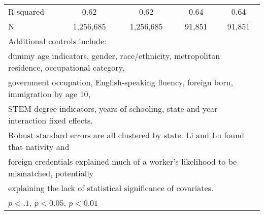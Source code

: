 \begin{table}[htbp]
\begin{tabular}{l*{4}{c}}
R-squared           &        0.62         &        0.62         &        0.64         &        0.64         \\
N                   &   1,256,685         &   1,256,685         &      91,851         &      91,851         \\
\bottomrule
\multicolumn{5}{l}{\footnotesize Additional controls include:}\\
\multicolumn{5}{l}{\footnotesize dummy age indicators, gender, race/ethnicity, metropolitan residence, occupational category,}\\
\multicolumn{5}{l}{\footnotesize government occupation, English-speaking fluency, foreign born, immigration by age 10,}\\
\multicolumn{5}{l}{\footnotesize STEM degree indicators, years of schooling, state and year interaction fixed effects.}\\
\multicolumn{5}{l}{\footnotesize Robust standard errors are all clustered by state. Li and Lu found that nativity and}\\
\multicolumn{5}{l}{\footnotesize foreign credentials explained much of a worker's likelihood to be mismatched, potentially}\\
\multicolumn{5}{l}{\footnotesize explaining the lack of statistical significance of covariates.}\\
\multicolumn{5}{l}{\footnotesize \sym{*} \(p<.1\), \sym{**} \(p<0.05\), \sym{***} \(p<0.01\)}\\
\end{tabular}
\end{table}

